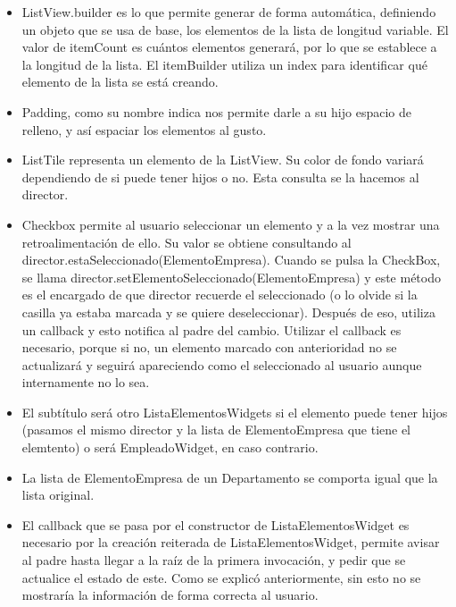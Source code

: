 \documentclass[
]{article}
\begin{document}
\begin{itemize}
\item
  ListView.builder es lo que permite generar de forma automática,
  definiendo un objeto que se usa de base, los elementos de la lista de
  longitud variable. El valor de itemCount es cuántos elementos
  generará, por lo que se establece a la longitud de la lista. El
  itemBuilder utiliza un index para identificar qué elemento de la lista
  se está creando.
\item
  Padding, como su nombre indica nos permite darle a su hijo espacio de
  relleno, y así espaciar los elementos al gusto.
\item
  ListTile representa un elemento de la ListView. Su color de fondo
  variará dependiendo de si puede tener hijos o no. Esta consulta se la
  hacemos al director.
\item
  Checkbox permite al usuario seleccionar un elemento y a la vez mostrar
  una retroalimentación de ello. Su valor se obtiene consultando al
  director.estaSeleccionado(ElementoEmpresa). Cuando se pulsa la
  CheckBox, se llama director.setElementoSeleccionado(ElementoEmpresa) y
  este método es el encargado de que director recuerde el seleccionado
  (o lo olvide si la casilla ya estaba marcada y se quiere
  deseleccionar). Después de eso, utiliza un callback y esto notifica al
  padre del cambio. Utilizar el callback es necesario, porque si no, un
  elemento marcado con anterioridad no se actualizará y seguirá
  apareciendo como el seleccionado al usuario aunque internamente no lo
  sea.
\item
  El subtítulo será otro ListaElementosWidgets si el elemento puede
  tener hijos (pasamos el mismo director y la lista de ElementoEmpresa
  que tiene el elemtento) o será EmpleadoWidget, en caso contrario.
\item
  La lista de ElementoEmpresa de un Departamento se comporta igual que
  la lista original.
\item
  El callback que se pasa por el constructor de ListaElementosWidget es
  necesario por la creación reiterada de ListaElementosWidget, permite
  avisar al padre hasta llegar a la raíz de la primera invocación, y
  pedir que se actualice el estado de este. Como se explicó
  anteriormente, sin esto no se mostraría la información de forma
  correcta al usuario.
\end{itemize}
\end{document}
